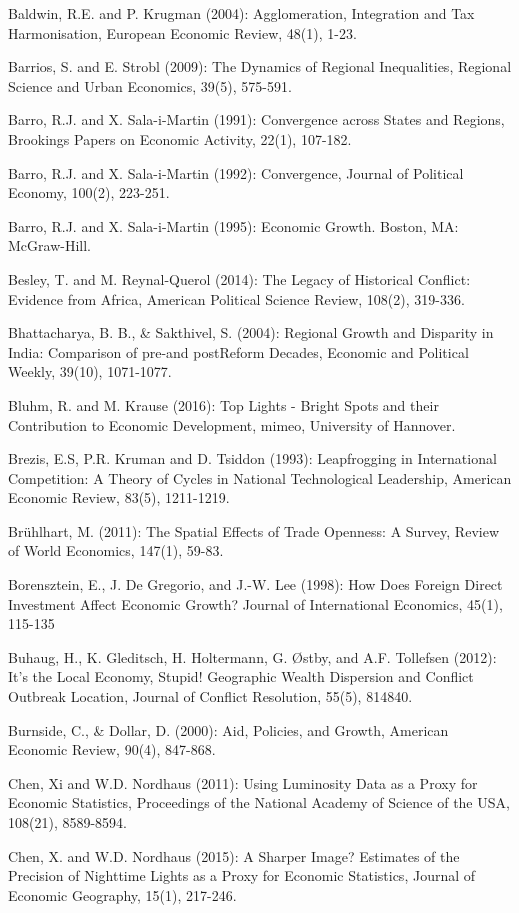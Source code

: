 \documentclass[10pt]{article}
\begin{document}
Baldwin, R.E. and P. Krugman (2004): Agglomeration, Integration and Tax Harmonisation, European Economic Review, 48(1), 1-23.

Barrios, S. and E. Strobl (2009): The Dynamics of Regional Inequalities, Regional Science and Urban Economics, 39(5), 575-591.

Barro, R.J. and X. Sala-i-Martin (1991): Convergence across States and Regions, Brookings Papers on Economic Activity, 22(1), 107-182.

Barro, R.J. and X. Sala-i-Martin (1992): Convergence, Journal of Political Economy, 100(2), 223-251.

Barro, R.J. and X. Sala-i-Martin (1995): Economic Growth. Boston, MA: McGraw-Hill.

Besley, T. and M. Reynal-Querol (2014): The Legacy of Historical Conflict: Evidence from Africa, American Political Science Review, 108(2), 319-336.

Bhattacharya, B. B., \& Sakthivel, S. (2004): Regional Growth and Disparity in India: Comparison of pre-and postReform Decades, Economic and Political Weekly, 39(10), 1071-1077.

Bluhm, R. and M. Krause (2016): Top Lights - Bright Spots and their Contribution to Economic Development, mimeo, University of Hannover.

Brezis, E.S, P.R. Kruman and D. Tsiddon (1993): Leapfrogging in International Competition: A Theory of Cycles in National Technological Leadership, American Economic Review, 83(5), 1211-1219.

Brühlhart, M. (2011): The Spatial Effects of Trade Openness: A Survey, Review of World Economics, 147(1), 59-83.

Borensztein, E., J. De Gregorio, and J.-W. Lee (1998): How Does Foreign Direct Investment Affect Economic Growth? Journal of International Economics, 45(1), 115-135

Buhaug, H., K. Gleditsch, H. Holtermann, G. Østby, and A.F. Tollefsen (2012): It's the Local Economy, Stupid! Geographic Wealth Dispersion and Conflict Outbreak Location, Journal of Conflict Resolution, 55(5), 814840.

Burnside, C., \& Dollar, D. (2000): Aid, Policies, and Growth, American Economic Review, 90(4), 847-868.

Chen, Xi and W.D. Nordhaus (2011): Using Luminosity Data as a Proxy for Economic Statistics, Proceedings of the National Academy of Science of the USA, 108(21), 8589-8594.

Chen, X. and W.D. Nordhaus (2015): A Sharper Image? Estimates of the Precision of Nighttime Lights as a Proxy for Economic Statistics, Journal of Economic Geography, 15(1), 217-246.
\end{document}

